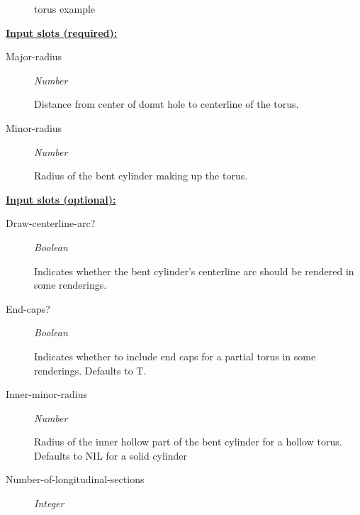 \documentclass [11pt]{book}
\begin{document}
\begin{itemize}
\begin{figure}
\caption{torus example}

\label{fig:torus}

\end{figure}





\textbf{
\underline{Input slots (required):}}

\begin{description}

\item [Major-radius]
\emph{Number}

 Distance from center of donut hole to centerline of the torus.




\item [Minor-radius]
\emph{Number}

 Radius of the bent cylinder making up the torus.




\end{description}






\textbf{
\underline{Input slots (optional):}}

\begin{description}

\item [Draw-centerline-arc?]
\emph{Boolean}

 Indicates whether the bent cylinder's centerline arc should be rendered in some renderings.




\item [End-caps?]
\emph{Boolean}

 Indicates whether to include end caps for a partial torus in some renderings. Defaults to T.




\item [Inner-minor-radius]
\emph{Number}

 Radius of the inner hollow part of the bent cylinder for a hollow torus. Defaults to NIL for a solid cylinder




\item [Number-of-longitudinal-sections]
\emph{Integer}


\end{description}
\end{itemize}
\end{document}
